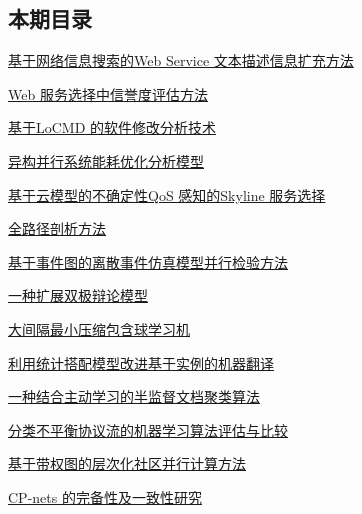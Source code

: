 \documentclass[a4paper]{article}
\begin{document}
\subsection{本期目录}
\href{http://www.jos.org.cn/ch/reader/download_pdf.aspx?file_no=4088&year_id=2012&quarter_id=6&falg=1}{基于网络信息搜索的Web Service 文本描述信息扩充方法}

\href{http://www.jos.org.cn/ch/reader/download_pdf.aspx?file_no=4051&year_id=2012&quarter_id=6&falg=1}{Web 服务选择中信誉度评估方法}

\href{http://www.jos.org.cn/ch/reader/download_pdf.aspx?file_no=4072&year_id=2012&quarter_id=6&falg=1}{基于LoCMD 的软件修改分析技术}

\href{http://www.jos.org.cn/ch/reader/download_pdf.aspx?file_no=4078&year_id=2012&quarter_id=6&falg=1}{异构并行系统能耗优化分析模型}

\href{http://www.jos.org.cn/ch/reader/download_pdf.aspx?file_no=4084&year_id=2012&quarter_id=6&falg=1}{基于云模型的不确定性QoS 感知的Skyline 服务选择}

\href{http://www.jos.org.cn/ch/reader/download_pdf.aspx?file_no=4102&year_id=2012&quarter_id=6&falg=1}{全路径剖析方法}

\href{http://www.jos.org.cn/ch/reader/download_pdf.aspx?file_no=4047&year_id=2012&quarter_id=6&falg=1}{基于事件图的离散事件仿真模型并行检验方法}

\href{http://www.jos.org.cn/ch/reader/download_pdf.aspx?file_no=4067&year_id=2012&quarter_id=6&falg=1}{一种扩展双极辩论模型}

\href{http://www.jos.org.cn/ch/reader/download_pdf.aspx?file_no=4071&year_id=2012&quarter_id=6&falg=1}{大间隔最小压缩包含球学习机}

\href{http://www.jos.org.cn/ch/reader/download_pdf.aspx?file_no=4069&year_id=2012&quarter_id=6&falg=1}{利用统计搭配模型改进基于实例的机器翻译}

\href{http://www.jos.org.cn/ch/reader/download_pdf.aspx?file_no=4073&year_id=2012&quarter_id=6&falg=1}{一种结合主动学习的半监督文档聚类算法}

\href{http://www.jos.org.cn/ch/reader/download_pdf.aspx?file_no=4074&year_id=2012&quarter_id=6&falg=1}{分类不平衡协议流的机器学习算法评估与比较}

\href{http://www.jos.org.cn/ch/reader/download_pdf.aspx?file_no=4076&year_id=2012&quarter_id=6&falg=1}{基于带权图的层次化社区并行计算方法}

\href{http://www.jos.org.cn/ch/reader/download_pdf.aspx?file_no=4090&year_id=2012&quarter_id=6&falg=1}{CP-nets 的完备性及一致性研究}
\end{document}

